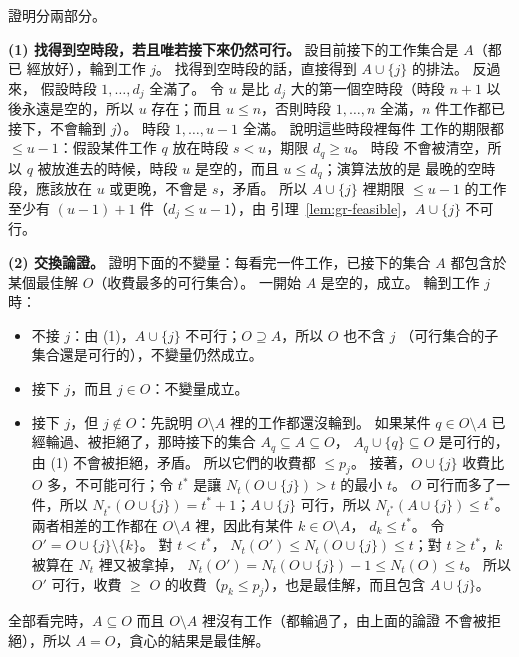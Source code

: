 \begin{whybox}[貪心是最佳的]
證明分兩部分。

\textbf{(1) 找得到空時段，若且唯若接下來仍然可行。} 設目前接下的工作集合是 $A$（都已
經放好），輪到工作 $j$。 找得到空時段的話，直接得到 $A \cup \{j\}$ 的排法。 反過來，
假設時段 $1, \ldots, d_j$ 全滿了。 令 $u$ 是比 $d_j$ 大的第一個空時段（時段 $n + 1$
以後永遠是空的，所以 $u$ 存在；而且 $u \le n$，否則時段 $1, \ldots, n$ 全滿，$n$ 件工作都已
接下，不會輪到 $j$）。 時段 $1, \ldots, u - 1$ 全滿。 說明這些時段裡每件
工作的期限都 $\le u - 1$：假設某件工作 $q$ 放在時段 $s < u$，期限 $d_q \ge u$。 時段
不會被清空，所以 $q$ 被放進去的時候，時段 $u$ 是空的，而且 $u \le d_q$；演算法放的是
最晚的空時段，應該放在 $u$ 或更晚，不會是 $s$，矛盾。 所以 $A \cup \{j\}$ 裡期限
$\le u - 1$ 的工作至少有 $(u - 1) + 1$ 件（$d_j \le u - 1$），由
引理~\ref{lem:gr-feasible}，$A \cup \{j\}$ 不可行。

\textbf{(2) 交換論證。} 證明下面的不變量：每看完一件工作，已接下的集合 $A$ 都包含於
某個最佳解 $O$（收費最多的可行集合）。 一開始 $A$ 是空的，成立。 輪到工作 $j$ 時：

\begin{itemize}
\item 不接 $j$：由 (1)，$A \cup \{j\}$ 不可行；$O \supseteq A$，所以 $O$ 也不含 $j$
（可行集合的子集合還是可行的），不變量仍然成立。
\item 接下 $j$，而且 $j \in O$：不變量成立。
\item 接下 $j$，但 $j \notin O$：先說明 $O \setminus A$ 裡的工作都還沒輪到。 如果某件
$q \in O \setminus A$ 已經輪過、被拒絕了，那時接下的集合 $A_q \subseteq A \subseteq O$，
$A_q \cup \{q\} \subseteq O$ 是可行的，由 (1) 不會被拒絕，矛盾。 所以它們的收費都
$\le p_j$。 接著，$O \cup \{j\}$ 收費比 $O$ 多，不可能可行；令 $t^*$ 是讓
$N_t(O \cup \{j\}) > t$ 的最小 $t$。 $O$ 可行而多了一件，所以
$N_{t^*}(O \cup \{j\}) = t^* + 1$；$A \cup \{j\}$ 可行，所以 $N_{t^*}(A \cup \{j\})
\le t^*$。 兩者相差的工作都在 $O \setminus A$ 裡，因此有某件 $k \in O \setminus A$，
$d_k \le t^*$。 令 $O' = O \cup \{j\} \setminus \{k\}$。 對 $t < t^*$，
$N_t(O') \le N_t(O \cup \{j\}) \le t$；對 $t \ge t^*$，$k$ 被算在 $N_t$ 裡又被拿掉，
$N_t(O') = N_t(O \cup \{j\}) - 1 \le N_t(O) \le t$。 所以 $O'$ 可行，收費
$\ge$ $O$ 的收費（$p_k \le p_j$），也是最佳解，而且包含 $A \cup \{j\}$。
\end{itemize}

全部看完時，$A \subseteq O$ 而且 $O \setminus A$ 裡沒有工作（都輪過了，由上面的論證
不會被拒絕），所以 $A = O$，貪心的結果是最佳解。
\end{whybox}

